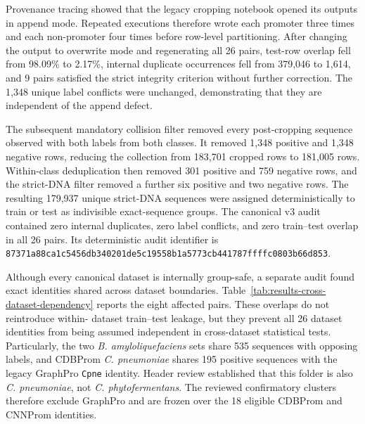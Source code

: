 Provenance tracing showed that the legacy cropping notebook opened its outputs
in append mode. Repeated executions therefore wrote each promoter three times
and each non-promoter four times before row-level partitioning. After changing
the output to overwrite mode and regenerating all 26 pairs, test-row overlap
fell from 98.09\% to 2.17\%, internal duplicate occurrences fell from 379,046
to 1,614, and 9 pairs satisfied the strict integrity criterion without further
correction. The 1,348 unique label conflicts were unchanged, demonstrating that
they are independent of the append defect.

The subsequent mandatory collision filter removed every post-cropping sequence
observed with both labels from both classes. It removed 1,348 positive and 1,348
negative rows, reducing the collection from 183,701 cropped rows to 181,005
rows. Within-class deduplication then removed 301 positive and 759 negative
rows, and the strict-DNA filter removed a further six positive and two negative
rows. The resulting 179,937 unique strict-DNA sequences were assigned
deterministically to train or test as indivisible exact-sequence groups. The
canonical v3 audit contained zero internal duplicates, zero label conflicts,
and zero train--test overlap in all 26 pairs. Its deterministic audit identifier
is \texttt{87371a88ca1c5456db340201de5c19558b1a5773cb441787ffffc0803b66d853}.

Although every canonical dataset is internally group-safe, a separate audit
found exact identities shared across dataset boundaries. Table~\ref{tab:results-cross-dataset-dependency}
reports the eight affected pairs. These overlaps do not reintroduce within-
dataset train--test leakage, but they prevent all 26 dataset identities from
being assumed independent in cross-dataset statistical tests. Particularly,
the two \textit{B. amyloliquefaciens} sets share 535 sequences with opposing
labels, and CDBProm \textit{C. pneumoniae} shares 195 positive sequences with
the legacy GraphPro \texttt{Cpne} identity. Header review established that this
folder is also \textit{C. pneumoniae}, not \textit{C. phytofermentans}. The
reviewed confirmatory clusters therefore exclude GraphPro and are frozen over
the 18 eligible CDBProm and CNNProm identities.

